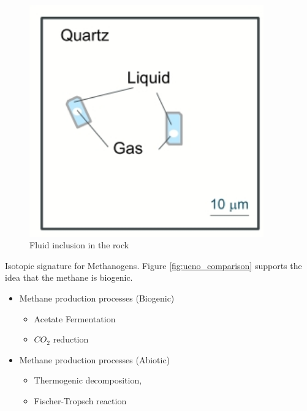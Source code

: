 \documentclass[]{article}
\begin{document}
\begin{figure}[H]
	\caption{Fluid inclusion in the rock}\label{fig:FluidInclusionInTheRock}
	\includegraphics[width=0.9\textwidth]{FluidInclusionInTheRock}
\end{figure}

Isotopic signature for Methanogens. Figure \ref{fig:ueno_comparison} supports the idea that the methane is biogenic.
\begin{itemize}
	\item Methane production processes (Biogenic)
	\begin{itemize}
		\item 	Acetate Fermentation
		\item $CO_2$ reduction
	\end{itemize}
	\item Methane production processes (Abiotic)
	\begin{itemize}
		\item Thermogenic decomposition,
		\item Fischer-Tropsch reaction
	\end{itemize}
\end{itemize}
\end{document}
